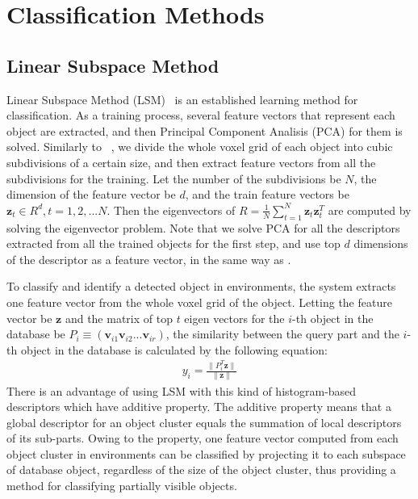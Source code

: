 \documentclass[conference]{sty/IEEEtran}
\begin{document}
\section{Classification Methods}
\label{sec:classification}

\subsection{Linear Subspace Method}
\label{sec:subspace}
Linear Subspace Method (LSM)~\cite{watanabe1973} is an established learning method for classification. 
As a training process, several feature vectors that represent each object are extracted, 
and then Principal Component Analisis (PCA) for them is solved. 
Similarly to ~\cite{kanezaki2010icra}, we divide the whole voxel grid of each object into 
cubic subdivisions of a certain size, and then extract feature vectors from all the subdivisions for the training. 
Let the number of the subdivisions be $N$, the dimension of the feature vector be $d$, 
and the train feature vectors be $\bm{z}_t \in R^d, t=1,2,...N$. 
Then the eigenvectors of $R=\frac{1}{N} \sum^{N}_{t=1} \bm{z}_t \bm{z}_t^T$ are computed by solving the eigenvector problem. 
Note that we solve PCA for all the descriptors extracted from all the trained objects for the first step, 
and use top $d$ dimensions of the descriptor as a feature vector, in the same way as \cite{kanezaki2010icra}.

To classify and identify a detected object in environments, the system extracts one feature vector from the whole voxel grid of the object. 
Letting the feature vector be $\bm{z}$ and the matrix of top $t$ eigen vectors for the $i$-th object in the database be $P_i \equiv (\bm{v}_{i1} \bm{v}_{i2} ... \bm{v}_{ir})$,
the similarity between the query part and the $i$-th object in the database is calculated by the following equation:
\begin{eqnarray}\label{eq:y_calc}
  y_i = \frac{\| P_i^T \bm{z} \|}{\| \bm{z} \|}
\end{eqnarray}
There is an advantage of using LSM with this kind of histogram-based descriptors which have additive property. 
The additive property means that a global descriptor for an object cluster equals the summation of local descriptors of its sub-parts. 
Owing to the property, one feature vector computed from each object cluster in environments can be classified by projecting it to 
each subspace of database object, regardless of the size of the object cluster, thus providing a method for classifying partially visible objects.
\end{document}

